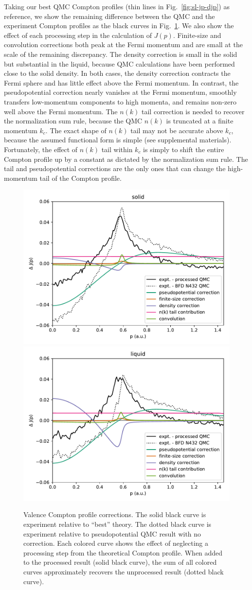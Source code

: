 Taking our best QMC Compton profiles (thin lines in Fig.~\ref{fig:sl-jp-djp}) as reference, we show the remaining difference between the QMC and the experiment Compton profiles as the black curves in Fig.~\ref{fig:sl-corrections}. We also show the effect of each processing step in the calculation of $J(p)$. Finite-size and convolution corrections both peak at the Fermi momentum and are small at the scale of the remaining discrepancy. The density correction is small in the solid but substantial in the liquid, because QMC calculations have been performed close to the solid density. In both cases, the density correction contracts the Fermi sphere and has little effect above the Fermi momentum. In contrast, the pseudopotential correction nearly vanishes at the Fermi momentum, smoothly transfers low-momentum components to high momenta, and remains non-zero well above the Fermi momentum. The $n(k)$ tail correction is needed to recover the normalization sum rule, because the QMC $n(k)$ is truncated at a finite momentum $k_c$. The exact shape of $n(k)$ tail may not be accurate above $k_c$, because the assumed functional form is simple (see supplemental materials). Fortunately, the effect of $n(k)$ tail within $k_c$ is simply to shift the entire Compton profile up by a constant as dictated by the normalization sum rule. The tail and pseudopotential corrections are the only ones that can change the high-momentum tail of the Compton profile.

\begin{figure}[h]
\centering
\includegraphics[width=0.49\linewidth]{li58_solid-the-djp}
\includegraphics[width=0.49\linewidth]{li58_liquid-the-djp}
\caption{Valence Compton profile corrections. The solid black curve is experiment relative to ``best'' theory. The dotted black curve is experiment relative to pseudopotential QMC result with no correction. Each colored curve shows the effect of neglecting a processing step from the theoretical Compton profile. When added to the processed result (solid black curve), the sum of all colored curves approximately recovers the unprocessed result (dotted black curve). \label{fig:sl-corrections}}
\end{figure}


